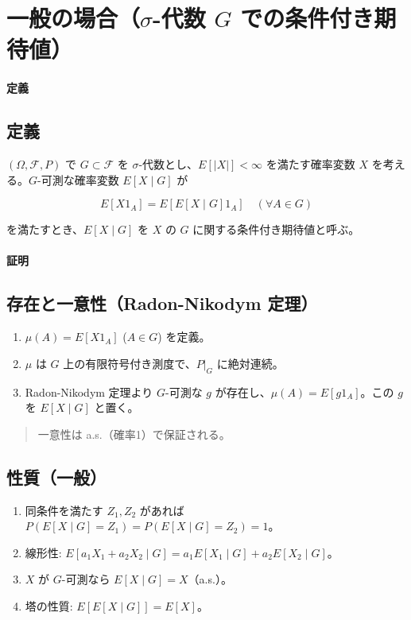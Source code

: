 \documentclass[uplatex,dvipdfmx,11pt,a4paper,openany]{bxjsbook}
\newenvironment{noteblock}{\begin{quote}\color{black!72}\small}{\end{quote}}
\begin{document}
\section{一般の場合（$\sigma$-代数 $G$ での条件付き期待値）}
\paragraph{定義}
\subsection{定義}
$(\Omega, \mathcal{F}, P)$ で $G \subset \mathcal{F}$ を $\sigma$-代数とし、$E[|X|]<\infty$ を満たす確率変数 $X$ を考える。$G$-可測な確率変数 $E[X \mid G]$ が

\[
            E[X 1_A] = E[E[X \mid G] 1_A] \quad (\forall A \in G)
          \]

を満たすとき、$E[X \mid G]$ を $X$ の $G$ に関する条件付き期待値と呼ぶ。


\paragraph{証明}
\subsection{存在と一意性（Radon-Nikodym 定理）}
\begin{enumerate}
\item $\mu(A)=E[X 1_A]$ ($A \in G$) を定義。
\item $\mu$ は $G$ 上の有限符号付き測度で、$P|_G$ に絶対連続。
\item Radon-Nikodym 定理より $G$-可測な $g$ が存在し、$\mu(A)=E[g 1_A]$。この $g$ を $E[X \mid G]$ と置く。
\end{enumerate}

\begin{noteblock}
一意性は a.s.（確率1）で保証される。
\end{noteblock}


\subsection{性質（一般）}
\begin{enumerate}
\item 同条件を満たす $Z_1, Z_2$ があれば $P(E[X \mid G]=Z_1)=P(E[X \mid G]=Z_2)=1$。
\item 線形性: $E[a_1 X_1 + a_2 X_2 \mid G] = a_1 E[X_1 \mid G] + a_2 E[X_2 \mid G]$。
\item $X$ が $G$-可測なら $E[X \mid G] = X$（a.s.）。
\item 塔の性質: $E[E[X \mid G]] = E[X]$。
\end{enumerate}
\end{document}
